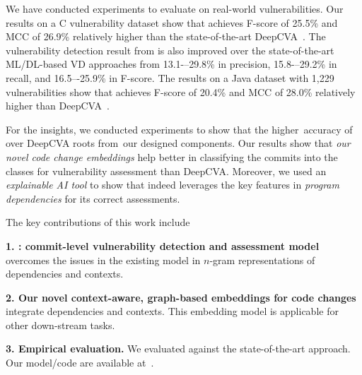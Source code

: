 We have conducted experiments to evaluate {\tool} on real-world
vulnerabilities. Our results on a C vulnerability dataset
show that {\tool} achieves F-score of 25.5\% and MCC of 26.9\%
relatively higher than the state-of-the-art
DeepCVA~\cite{deepCVA-ase21}.  The vulnerability detection result from
{\tool} is also improved over the state-of-the-art ML/DL-based VD
approaches from 13.1-–29.8\% in precision, 15.8-–29.2\% in recall,
and 16.5–-25.9\% in F-score. The results on a Java dataset with 1,229
vulnerabilities show that {\tool} achieves F-score of 20.4\% and MCC
of 28.0\% relatively higher than DeepCVA~\cite{deepCVA-ase21}.


For the insights, we conducted experiments to show that the
higher~accuracy of {\tool} over DeepCVA roots from~our designed
components.
Our results show that {\em our novel code change embeddings} help
{\tool} better in classifying the commits into the classes for
vulnerability assessment than DeepCVA. Moreover, we used an {\em
  explainable AI tool} to show that {\tool} indeed leverages the key
features in {\em program dependencies} for its correct
assessments.

The key contributions of this work include

{\bf 1. {\tool}: commit-level vulnerability detection and assessment
  model} overcomes the issues in the existing model in $n$-gram
representations of dependencies and contexts.

{\bf 2. Our novel context-aware, graph-based embeddings for code
  changes}
integrate dependencies and contexts. This embedding model
is applicable for other down-stream tasks.


{\bf 3. Empirical evaluation.} We evaluated {\tool} 
against the state-of-the-art approach.
Our model/code are available at~\cite{cat-website}.

